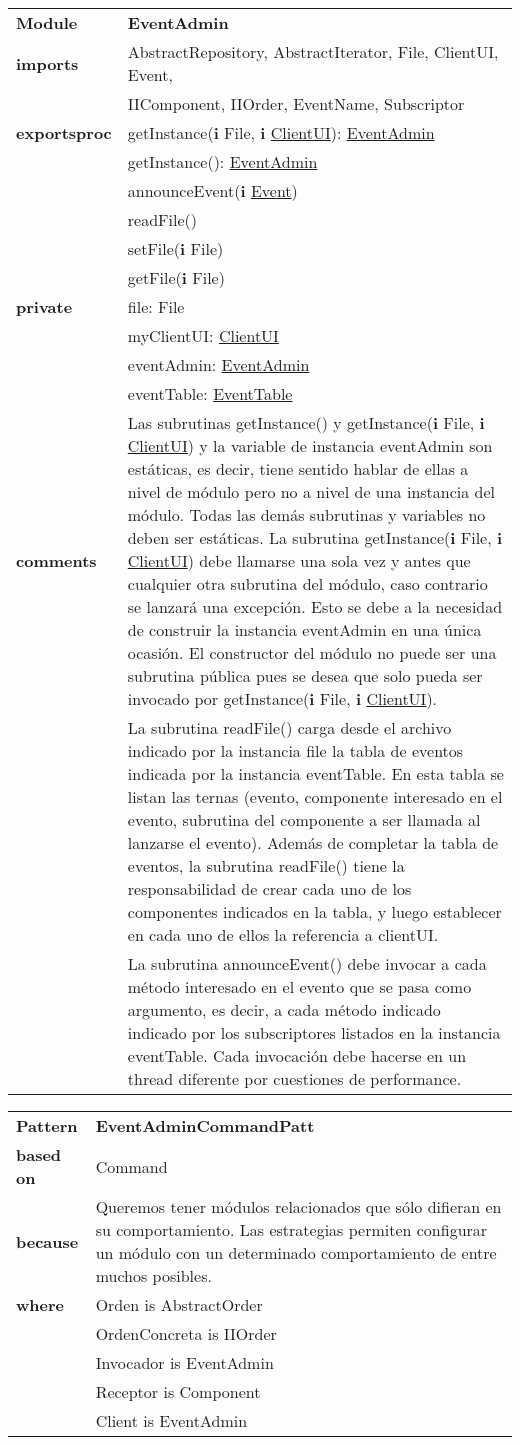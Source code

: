 \documentclass[12pt,a4paper,fleqn]{report}
\newenvironment{module}[1]{\hypertarget{mi:#1}{} \vspace{0.5cm}\noindent\begin{tabular}{|p{0.2\textwidth} p{0.75\textwidth}|} \hline{\bf Module} & {\bf #1} \\}{\hline\end{tabular}\vspace{0.5cm}}
\newcommand{\eproc}{{\bf exportsproc}}
\newcommand{\priv}{{\bf private}}
\newcommand{\proc}[1]{& #1 \\}
\newcommand{\e}[1]{{\bf i} \hyperlink{mi:#1}{#1}}
\newcommand{\eb}[1]{{\bf i} #1}
\newcommand{\imp}[1]{{\bf imports} & #1 \\}
\newcommand{\comm}[1]{{\bf comments} & #1 \\}
\newcommand{\mdr}[1]{\hyperlink{mi:#1}{#1}}
\newcommand{\extraline}[1]{& #1 \\}
\newenvironment{pattern}[1]{\vspace{0.5cm}\noindent\begin{tabular}{|p{0.2\textwidth} p{0.70\textwidth}|} \hline{\bf Pattern} & {\bf #1} \\}{\hline\end{tabular}\vspace{0.5cm}}
\newcommand{\based}[1]{{\bf based on} & #1 \\}
\newcommand{\bec}[1]{{\bf because} & #1 \\}
\newcommand{\pwhere}{{\bf where}}
\begin{document}
\begin{module}{EventAdmin}
\imp{AbstractRepository, AbstractIterator, File, ClientUI, Event,}
\extraline{IIComponent, IIOrder, EventName, Subscriptor}
\eproc
\proc{getInstance(\eb {File}, \e {ClientUI}): \mdr{EventAdmin}}
\proc{getInstance(): \mdr{EventAdmin}}
\proc{announceEvent(\e {Event})}
\proc{readFile()}
\proc{setFile(\eb {File})}
\proc{getFile(\eb {File})}
\priv
\proc{file: File}
\proc{myClientUI: \mdr{ClientUI}}
\proc{eventAdmin: \mdr{EventAdmin}}
\proc{eventTable: \mdr{EventTable}}
\comm{Las subrutinas getInstance() y getInstance(\eb {File}, \e {ClientUI}) y la variable de instancia eventAdmin son estáticas, es decir, tiene sentido hablar de ellas a nivel de módulo pero no a nivel de una instancia del módulo. Todas las demás subrutinas y variables no deben ser estáticas. La subrutina getInstance(\eb {File}, \e {ClientUI}) debe llamarse una sola vez y antes que cualquier otra subrutina del módulo, caso contrario se lanzará una excepción. Esto se debe a la necesidad de construir la instancia eventAdmin en una única ocasión. El constructor del módulo no puede ser una subrutina pública pues se desea que solo pueda ser invocado por getInstance(\eb {File}, \e {ClientUI}).}
\extraline{La subrutina readFile() carga desde el archivo indicado por la instancia file la tabla de eventos indicada por la instancia eventTable. En esta tabla se listan las ternas (evento, componente interesado en el evento, subrutina del componente a ser llamada al lanzarse el evento). Además de completar la tabla de eventos, la subrutina readFile() tiene la responsabilidad de crear cada uno de los componentes indicados en la tabla, y luego establecer en cada uno de ellos la referencia a clientUI.}
\extraline{La subrutina announceEvent() debe invocar a cada método interesado en el evento que se pasa como argumento, es decir, a cada método indicado indicado por los subscriptores listados en la instancia eventTable. Cada invocación debe hacerse en un thread diferente por cuestiones de performance.}
\end{module}



\begin{pattern}{EventAdminCommandPatt}
\based{Command}
\bec{Queremos tener módulos relacionados que sólo difieran en su comportamiento. Las estrategias permiten configurar un módulo con un determinado comportamiento de entre muchos posibles.}
\pwhere
\proc{Orden is AbstractOrder}
\proc{OrdenConcreta is IIOrder}
\proc{Invocador is EventAdmin}
\proc{Receptor is Component}
\proc{Client is EventAdmin}
\end{pattern}
\end{document}
